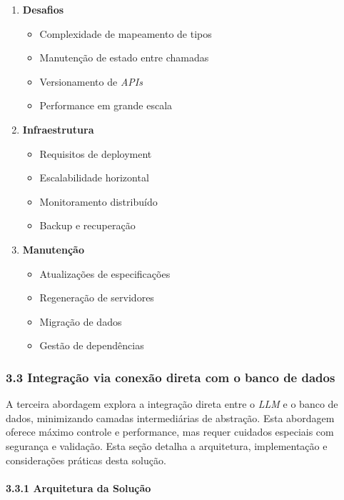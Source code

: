 \documentclass[
]{article}
\providecommand{\tightlist}{%
  \setlength{\itemsep}{0pt}\setlength{\parskip}{0pt}}
\begin{document}
\begin{enumerate}
\def\labelenumi{\arabic{enumi}.}
\item
  \textbf{Desafios}

  \begin{itemize}
  \tightlist
  \item
    Complexidade de mapeamento de tipos
  \item
    Manutenção de estado entre chamadas
  \item
    Versionamento de \emph{APIs}
  \item
    Performance em grande escala
  \end{itemize}
\item
  \textbf{Infraestrutura}

  \begin{itemize}
  \tightlist
  \item
    Requisitos de deployment
  \item
    Escalabilidade horizontal
  \item
    Monitoramento distribuído
  \item
    Backup e recuperação
  \end{itemize}
\item
  \textbf{Manutenção}

  \begin{itemize}
  \tightlist
  \item
    Atualizações de especificações
  \item
    Regeneração de servidores
  \item
    Migração de dados
  \item
    Gestão de dependências
  \end{itemize}
\end{enumerate}

\subsubsection{3.3 Integração via conexão direta com o banco de
dados}\label{integrauxe7uxe3o-via-conexuxe3o-direta-com-o-banco-de-dados}

A terceira abordagem explora a integração direta entre o \emph{LLM} e o
banco de dados, minimizando camadas intermediárias de abstração. Esta
abordagem oferece máximo controle e performance, mas requer cuidados
especiais com segurança e validação. Esta seção detalha a arquitetura,
implementação e considerações práticas desta solução.

\paragraph{3.3.1 Arquitetura da
Solução}\label{arquitetura-da-soluuxe7uxe3o-2}
\end{document}
